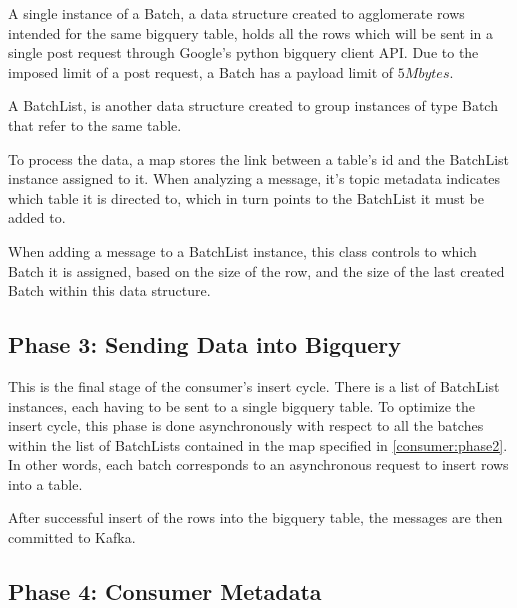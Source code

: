 A single instance of a Batch, a data structure created to agglomerate rows
intended for the same bigquery table, holds all the rows which will be sent in a
single post request through Google's python bigquery client API. Due to the
imposed limit of a post request, a Batch has a payload limit of $5 Mbytes$. 

A BatchList, is another data structure created to group instances of type Batch
that refer to the same table.

To process the data, a map stores the link between a table's id and the
BatchList instance assigned to it. When analyzing a message, it's topic metadata
indicates which table it is directed to, which in turn points to the BatchList
it must be added to.

When adding a message to a BatchList instance, this class controls to which
Batch it is assigned, based on the size of the row, and the size of the last
created Batch within this data structure.

\subsection{Phase 3: Sending Data into Bigquery}

This is the final stage of the consumer's insert cycle. There is a list of
BatchList instances, each having to be sent to a single bigquery table. To
optimize the insert cycle, this phase is done asynchronously with respect to all
the batches within the list of BatchLists contained in the map specified in
\ref{consumer:phase2}. In other words, each batch corresponds to an asynchronous
request to insert rows into a table.

After successful insert of the rows into the bigquery table, the messages are
then committed to Kafka. 

\subsection{Phase 4: Consumer Metadata}

